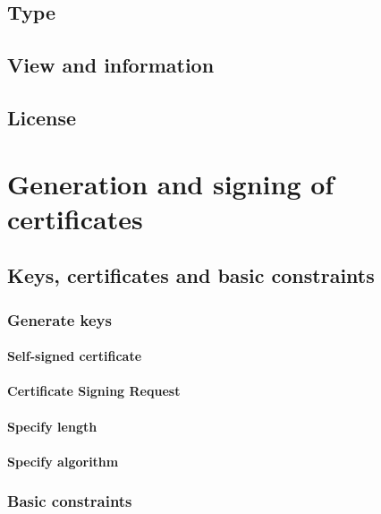 \documentclass[10pt, a4paper]{report}
\begin{document}
  \subsection{Type}
  
  \subsection{View and information}
  
  \subsection{License}

  
\section{Generation and signing of certificates}

  \subsection{Keys, certificates and basic constraints}
  
    \subsubsection{Generate keys}
    
      \paragraph{Self-signed certificate}
      
      \paragraph{Certificate Signing Request}
      
      \paragraph{Specify length}
      
      \paragraph{Specify algorithm}
      
    \subsubsection{Basic constraints}
    
\end{document}
